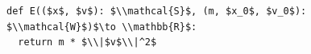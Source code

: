\documentclass[border=10pt]{standalone}
\begin{document}
\begin{lstlisting}
def E(($x$, $v$): $\\mathcal{S}$, (m, $x_0$, $v_0$): $\\mathcal{W}$)$\to \\mathbb{R}$:
  return m * $\\|$v$\\|^2$
\end{lstlisting}
\end{document}
